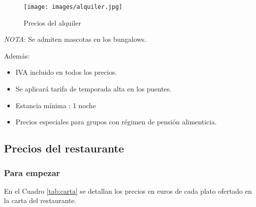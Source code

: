 \begin{figure}[h]
  \begin{center}
    \texttt{[image: images/alquiler.jpg]}
    \caption{Precios del alquiler}
    \label{fig:alquiler}
  \end{center}
\end{figure}

\emph{NOTA}: Se admiten mascotas en los bungalows.

Además:
\begin{itemize}
\item IVA incluido en todos los precios.
\item Se aplicará tarifa de temporada alta en los puentes.
\item Estancia mínima : 1 noche
\item Precios especiales para grupos con régimen de pensión alimenticia.
\end{itemize}

\subsection{Precios del restaurante}
\label{sec:precioRest}

\subsubsection{Para empezar}
\label{sec:carta}

En el Cuadro \ref{tab:carta} se detallan los precios en euros de cada plato ofertado en la carta del restaurante.

